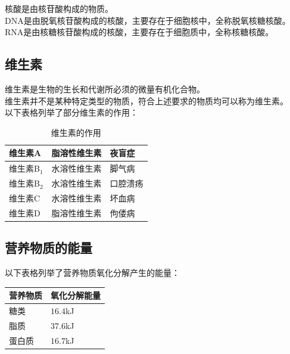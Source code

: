 \documentclass[UTF8]{ctexart}
\begin{document}
    核酸是由核苷酸构成的物质。\\[3mm]
    DNA是由脱氧核苷酸构成的核酸，主要存在于细胞核中，全称脱氧核糖核酸。\\[3mm]
    RNA是由核糖核苷酸构成的核酸，主要存在于细胞质中，全称核糖核酸。\\[3mm]

\newpage

\subsection{维生素}
    维生素是生物的生长和代谢所必须的微量有机化合物。\\[3mm]
    维生素并不是某种特定类型的物质，符合上述要求的物质均可以称为维生素。\\[3mm]
    以下表格列举了部分维生素的作用：\vspace{5pt}
    \begin{table}[h]
        \begin{center}
            \begin{tabular}{l|l|l}
                \hline
                维生素A\qquad\qquad&脂溶性维生素\qquad\qquad&夜盲症\qquad\qquad\\ \hline
                维生素B$_1$\qquad\qquad&水溶性维生素\qquad\qquad&脚气病\qquad\qquad\\ \hline
                维生素B$_2$\qquad\qquad&水溶性维生素\qquad\qquad&口腔溃疡\qquad\qquad\\ \hline
                维生素C\qquad\qquad&水溶性维生素\qquad\qquad&坏血病\qquad\qquad\\ \hline
                维生素D\qquad\qquad&脂溶性维生素\qquad\qquad&佝偻病\qquad\qquad\\ \hline
            \end{tabular}
            \caption{维生素的作用}
        \end{center}
    \end{table}

\subsection{营养物质的能量}
    以下表格列举了营养物质氧化分解产生的能量：\vspace{5pt}
    \begin{table}[h]
        \begin{center}
            \begin{tabular}{l|l}
                \hline
                营养物质\qquad\qquad&氧化分解能量\qquad\qquad\\ \hline
                糖类&$16.4$kJ\\ \hline
                脂质&$37.6$kJ\\ \hline
                蛋白质&$16.7$kJ\\ \hline
            \end{tabular}
        \end{center}
    \end{table}
\end{document}
